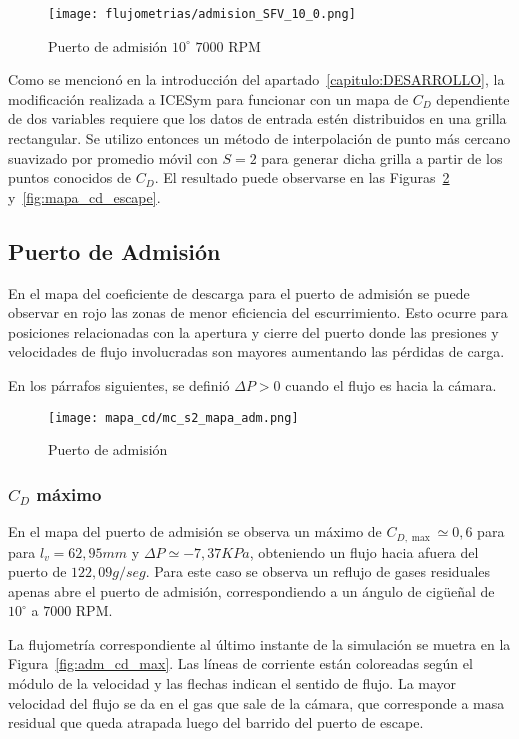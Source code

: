 \begin{figure}[ht]
  \centering
  \texttt{[image: flujometrias/admision\_SFV\_10\_0.png]}
  \caption{Puerto de admisión $10^{\circ}$ \@ $7000$ RPM}\label{fig:adm_10_7000rpm}
\end{figure}

Como se mencionó en la introducción del apartado~\ref{capitulo:DESARROLLO}, la
modificación realizada a ICESym para funcionar con un mapa de $C_{D}$
dependiente de dos variables requiere que los datos de entrada estén
distribuidos en una grilla rectangular.
%
Se utilizo entonces un método de interpolación de punto más cercano suavizado
por promedio móvil con $S=2$ para generar dicha grilla a partir de los puntos
conocidos de $C_{D}$.
%
El resultado puede observarse en las Figuras~\ref{fig:mapa_cd_admision}
y~\ref{fig:mapa_cd_escape}.


\subsection{Puerto de Admisión}
%
En el mapa del coeficiente de descarga para el puerto de admisión se puede
observar en rojo las zonas de menor eficiencia del escurrimiento.
%
%
Esto ocurre para posiciones relacionadas con la apertura y cierre del puerto
donde las presiones y velocidades de flujo involucradas son mayores aumentando
las pérdidas de carga.

En los párrafos siguientes, se definió $\Delta P>0$ cuando el flujo es hacia la
cámara.

\begin{figure}[ht!]
    \centering
    \texttt{[image: mapa\_cd/mc\_s2\_mapa\_adm.png]}
    \caption{Puerto de admisión}\label{fig:mapa_cd_admision}
\end{figure}

\subsubsection{$C_{D}$ máximo}
%
En el mapa del puerto de admisión se observa un máximo de $C_{D,\max}\simeq 0,6$
para para $l_{v}=62,95 mm$ y $\Delta P\simeq -7,37 KPa$, obteniendo un flujo
hacia afuera del puerto de $122,09 g/seg$.
%
Para este caso se observa un reflujo de gases residuales apenas abre el puerto
de admisión, correspondiendo a un ángulo de cigüeñal de $10^{\circ}$ a $7000$
RPM.

La flujometría correspondiente al último instante de la simulación se muetra en
la Figura~\ref{fig:adm_cd_max}.
%
Las líneas de corriente están coloreadas según el módulo de la velocidad y las
flechas indican el sentido de flujo.
%
La mayor velocidad del flujo se da en el gas que sale de la cámara, que
corresponde a masa residual que queda atrapada luego del barrido del puerto de
escape.

